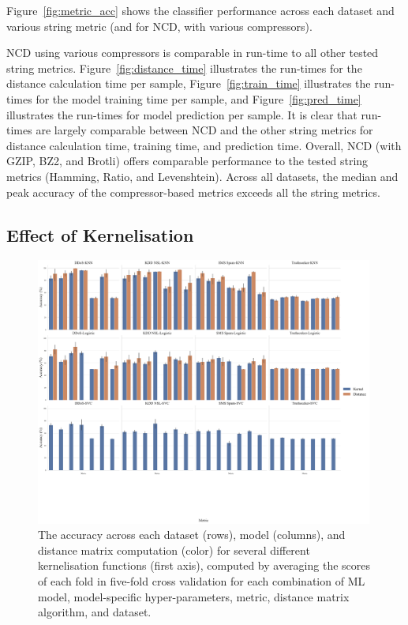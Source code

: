 \documentclass[preprint,12pt]{article}
\begin{document}
Figure~\ref{fig:metric_acc} shows the classifier performance across each dataset and various string metric (and for NCD, with various compressors).

NCD using various compressors is comparable in run-time to all other tested string metrics.
Figure~\ref{fig:distance_time} illustrates the run-times for the distance calculation time per sample, Figure~\ref{fig:train_time} illustrates the run-times for the model training time per sample, and Figure~\ref{fig:pred_time} illustrates the run-times for model prediction per sample. It is clear that run-times are largely comparable between NCD and the other string metrics for distance calculation time, training time, and prediction time.
Overall, NCD (with GZIP, BZ2, and Brotli) offers comparable performance to the tested string metrics (Hamming, Ratio, and Levenshtein). Across all datasets, the median and peak accuracy of the compressor-based metrics exceeds all the string metrics.



\subsection{Effect of Kernelisation}

\begin{figure}[p]
    \centering
    \includegraphics[width=0.99\textwidth]{images/accuracy_vs_kernel.pdf}
    \caption{The accuracy across each dataset (rows), model (columns), and distance matrix computation (color) for several different kernelisation functions (first axis), computed by averaging the scores of each fold in five-fold cross validation for each combination of  ML model, model-specific hyper-parameters, metric, distance matrix algorithm, and dataset.}
    \label{fig:kernel_acc}
\end{figure}
\end{document}
